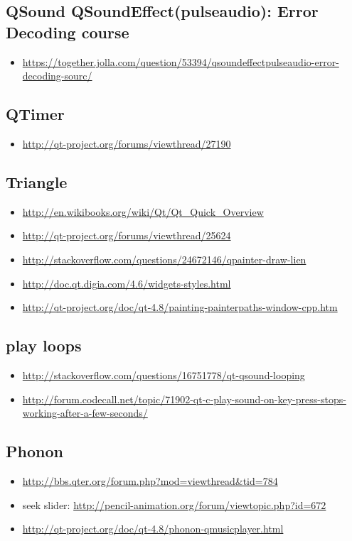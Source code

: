 \documentclass[9pt,b5paper]{article}
\begin{document}
\subsection{QSound QSoundEffect(pulseaudio): Error Decoding course}
\label{sec-15-17}
\begin{itemize}
\item \url{https://together.jolla.com/question/53394/qsoundeffectpulseaudio-error-decoding-sourc/}
\end{itemize}
\subsection{QTimer}
\label{sec-15-18}
\begin{itemize}
\item \url{http://qt-project.org/forums/viewthread/27190}
\end{itemize}
\subsection{Triangle}
\label{sec-15-19}
\begin{itemize}
\item \url{http://en.wikibooks.org/wiki/Qt/Qt_Quick_Overview}
\item \url{http://qt-project.org/forums/viewthread/25624}
\item \url{http://stackoverflow.com/questions/24672146/qpainter-draw-lien}
\item \url{http://doc.qt.digia.com/4.6/widgets-styles.html}
\item \url{http://qt-project.org/doc/qt-4.8/painting-painterpaths-window-cpp.htm}
\end{itemize}
\subsection{play loops}
\label{sec-15-20}
\begin{itemize}
\item \url{http://stackoverflow.com/questions/16751778/qt-qsound-looping}
\item \url{http://forum.codecall.net/topic/71902-qt-c-play-sound-on-key-press-stops-working-after-a-few-seconds/}
\end{itemize}
\subsection{Phonon}
\label{sec-15-21}
\begin{itemize}
\item \url{http://bbs.qter.org/forum.php?mod=viewthread&tid=784}
\item seek slider: \url{http://pencil-animation.org/forum/viewtopic.php?id=672}
\item \url{http://qt-project.org/doc/qt-4.8/phonon-qmusicplayer.html}
\end{itemize}
\end{document}
